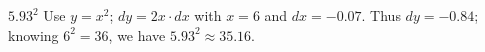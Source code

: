 {$5.93^2$
}
{Use $y = x^2$; $dy = 2x\cdot dx$ with $x=6$ and $dx = -0.07$. Thus $dy = -0.84$; knowing $6^2=36$, we have $5.93^2 \approx 35.16$.
}

